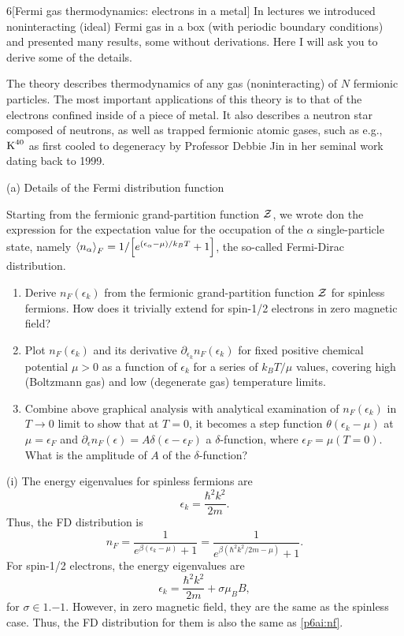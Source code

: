 \documentclass[12pt]{article}
\begin{document}
\begin{problem}{6}[Fermi gas thermodynamics: electrons in a metal]
In lectures we introduced noninteracting (ideal) Fermi gas in a box (with
periodic boundary conditions) and presented many results, some without
derivations. Here I will ask you to derive some of the details.

The theory describes thermodynamics of any gas (noninteracting) of $N$ fermionic
particles. The most important applications of this theory is to that of the
electrons confined inside of a piece of metal. It also describes a neutron star
composed of neutrons, as well as trapped fermionic atomic gases, such as e.g.,
$\text{K}^{40}$ as first cooled to degeneracy by Professor Debbie Jin in her
seminal work dating back to 1999.

(a) Details of the Fermi distribution function

Starting from the fermionic grand-partition function $\mathcal{Z}$, we wrote don the
expression for the expectation value for the occupation of the $\alpha$
single-particle state, namely
$\expval{n_\alpha}_F=1/\qty[e^{(\epsilon_\alpha-\mu)/k_BT}+1]$, the so-called
Fermi-Dirac distribution.
\begin{enumerate}[label=(\roman*)]
    \item Derive $n_F(\epsilon_k)$ from the fermionic grand-partition function $\mathcal{Z}$
for spinless fermions. How does it trivially extend for spin-1/2 electrons in
zero magnetic field?
\item Plot $n_F(\epsilon_k)$ and its derivative
$\partial_{\epsilon_k}n_F(\epsilon_k)$ for fixed positive chemical potential
$\mu>0$ as a function of $\epsilon_k$ for a series of $k_BT/\mu$ values,
covering high (Boltzmann gas) and low (degenerate gas) temperature limits.
\item Combine above graphical analysis with analytical examination of
    $n_F(\epsilon_k)$ in $T\to0$ limit to show that at $T=0$, it becomes a step
    function $\theta(\epsilon_k-\mu)$ at $\mu=\epsilon_F$ and $\partial_\epsilon
    n_F(\epsilon)=A\delta(\epsilon-\epsilon_F)$ a $\delta$-function, where
    $\epsilon_F=\mu(T=0)$. What is the amplitude of $A$ of the
    $\delta$-function?
\end{enumerate}
\begin{solution}
(i) The energy eigenvalues for spinless fermions are
\begin{equation}
    \epsilon_k=\frac{\hbar^2k^2}{2m}. 
\end{equation}
Thus, the FD distribution is
\begin{equation}\label{p6ai:nf}
    n_F=\frac1{e^{\beta(\epsilon_k-\mu)}+1}
    =\frac1{e^{\beta(\hbar^2k^2/2m-\mu)}+1}.
\end{equation}
For spin-1/2 electrons, the energy eigenvalues are
\begin{equation}
    \epsilon_k=\frac{\hbar^2k^2}{2m}+\sigma\mu_BB, 
\end{equation}
for $\sigma\in\qty{1,-1}$. However, in zero magnetic field, they are the same as
the spinless case. Thus, the FD distribution for them is also the same as
\eqref{p6ai:nf}.


\end{solution}
\end{problem}
\end{document}
